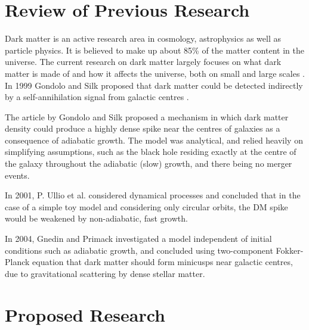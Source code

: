 \documentclass[a4paper,10pt]{article}
\begin{document}
\section{Review of Previous Research}


Dark matter is an active research area in cosmology, astrophysics as well as particle physics. It is believed to make up about 85\% of the matter content in the universe. The current research on dark matter largely focuses on what dark matter is made of and how it affects the universe, both on small and large scales \citep{this_probably_doesnt_need_a_citation}. In 1999 Gondolo and Silk proposed that dark matter could be detected indirectly by a self-annihilation signal from galactic centres \citep{GS_1999_original}. %

The article by Gondolo and Silk proposed a mechanism in which dark matter density could produce a highly dense spike near the centres of galaxies as a consequence of adiabatic growth. The model was analytical, and relied heavily on simplifying assumptions, such as the black hole residing exactly at the centre of the galaxy throughout the adiabatic (slow) growth, and there being no merger events. %

In 2001, P. Ullio et al. considered dynamical processes and concluded that in the case of a simple toy model and considering 
only circular orbits, the DM spike would be weakened by non-adiabatic, fast growth.

In 2004, Gnedin and Primack investigated a model independent of initial conditions such as adiabatic growth, and concluded using two-component 
Fokker-Planck equation that 
dark matter should form minicusps near galactic centres, due to gravitational scattering by dense stellar matter. 




\section{Proposed Research}

\end{document}
